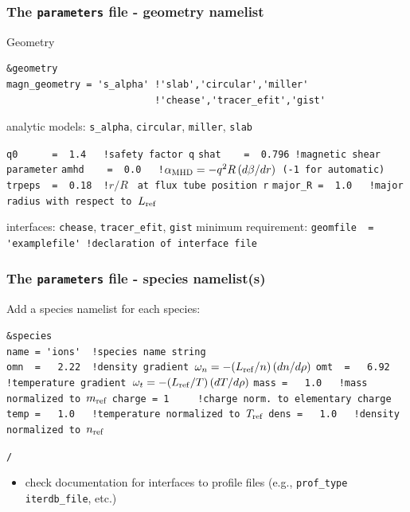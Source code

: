 \documentclass[10pt]{beamer}
\begin{document}
\begin{frame}[fragile]
  \frametitle{The {\tt parameters} file - geometry namelist}
  

\begin{block}{Geometry}

\begin{block}

\begin{verbatim}
&geometry
magn_geometry = 's_alpha' !'slab','circular','miller'
                          !'chease','tracer_efit','gist'
\end{verbatim}
\end{block}
\begin{block}{analytic models: {\tt s\_alpha}, {\tt circular}, {\tt miller}, {\tt slab}}

\verb|q0      =  1.4   !safety factor q|
\verb|shat    =  0.796 !magnetic shear parameter|
\verb|amhd    =  0.0   !|${\alpha_{\rm MHD}=-q^2R\,(d\beta/dr)}$\verb| (-1 for automatic)|
\verb|trpeps  =  0.18  !|$r/R$ \verb| at flux tube position r|
\verb|major_R =  1.0   !major radius with respect to |$L_{\rm ref}$
\end{block}

\begin{block}{interfaces: {\tt chease}, {\tt tracer\_efit}, {\tt gist}}
minimum requirement:
\verb|geomfile  =  'examplefile' !declaration of interface file|
\end{block}
\end{block}

\end{frame}


\begin{frame}[fragile]
  \frametitle{The {\tt parameters} file - species namelist({\bf s})}

\begin{block}

Add a species namelist for each species:
\begin{block}

\verb|&species|\\
\verb|name = 'ions'  !species name string|\\
\verb|omn  =   2.22  !density gradient |$\omega_n=-(L_{\rm ref}/n)\,(dn/d\rho)$
\verb|omt  =   6.92  !temperature gradient |$\omega_t=-(L_{\rm ref}/T)\,(dT/d\rho)$
\verb|mass =   1.0   !mass normalized to |$m_{\rm ref}$
\verb|charge = 1     !charge norm. to elementary charge|
\verb|temp =   1.0   !temperature normalized to |$T_{\rm ref}$
\verb|dens =   1.0   !density normalized to |$n_{\rm ref}$

\verb|/|
\end{block}
\begin{itemize}
 \item check documentation for interfaces to profile files (e.g., {\tt prof\_type}
 {\tt iterdb\_file}, etc.)
\end{itemize}

\end{block}

\end{frame}
\end{document}

